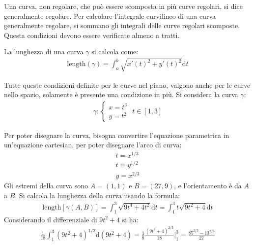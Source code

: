 \documentclass{article}
\newcommand{\df}{\mathrm{d}}
\numberwithin{equation}{subsection}
\begin{document}
Una curva, non regolare, che può essere scomposta in più curve regolari, si dice generalmente regolare. Per calcolare l'integrale curvilineo di una curva generalmente regolare, si sommano gli integrali delle curve regolari scomposte. Questa condizioni devono essere verificate almeno a tratti. 

La lunghezza di una curva $\gamma$ si calcola come:
\begin{gather*}
    \text{length}(\gamma)=\int_a^b\sqrt{x'(t)^2+y'(t)^2}\df t
\end{gather*}

Tutte queste condizioni definite per le curve nel piano, valgono anche per le curve nello spazio, solamente è presente una condizione in più. 
Si considera la curva $\gamma$:
\begin{gather*}
    \gamma:\begin{cases}
        x=t^3\\
        y=t^2
    \end{cases}\,\, t\in[1,3]
\end{gather*}

Per poter disegnare la curva, bisogna convertire l'equazione parametrica in un'equazione cartesian, per poter disegnare l'arco di curva:
\begin{gather*}
    t=x^{1/3}\\
    t=y^{1/2}\\
    y=x^{2/3}
\end{gather*}
Gli estremi della curva sono $A=(1,1)$ e $B=(27,9)$, e l'orientamento è da $A$ a $B$. 
Si calcola la lunghezza della curva usando la formula:
\begin{gather*}
    \text{length}[\gamma(A,B)]=\int_1^3\sqrt{9t^4+4t^2}\df t=\int_1^3t\sqrt{9t^2+4}\df t
\end{gather*}
Considerando il differenziale di $9t^2+4$ si ha:
\begin{gather*}
    \frac{1}{18}\int_1^3(9t^2+4)^{1/2}\df(9t^2+4)=\frac{1}{8}\frac{(9t^2+4)^{2/3}}{18}\bigg|_1^3=\frac{85^{2/3}-13^{2/3}}{27}
\end{gather*}
\end{document}
